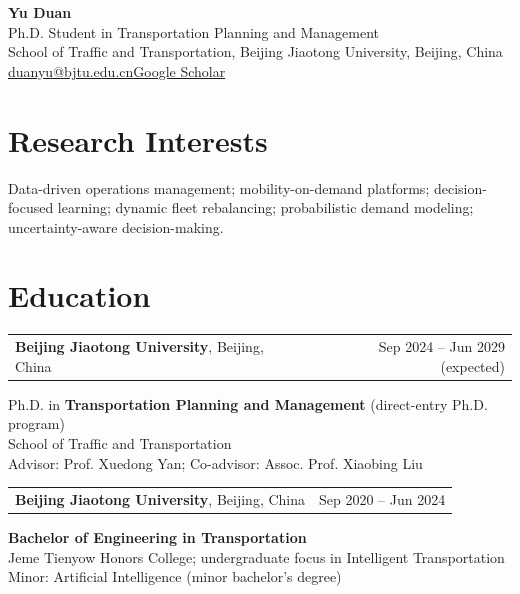 \documentclass[10.6pt,letterpaper]{article}
\newcommand{\rtime}[1]{{\small\color{muted}#1}}
\begin{document}
\begin{center}
{\fontsize{22}{25}\selectfont\bfseries Yu Duan}\\[4pt]
{\small Ph.D. Student in Transportation Planning and Management}\\[3pt]
{\small School of Traffic and Transportation, Beijing Jiaotong University, Beijing, China}\\[3pt]
{\small\href{mailto:duanyu@bjtu.edu.cn}{duanyu@bjtu.edu.cn}\quad \textbar\quad \href{https://scholar.google.com/citations?user=pLcJk40AAAAJ}{Google Scholar}}
\end{center}
\vspace{-3pt}

\section*{Research Interests}
Data-driven operations management; mobility-on-demand platforms; decision-focused learning; dynamic fleet rebalancing; probabilistic demand modeling; uncertainty-aware decision-making.

\section*{Education}
\begin{tabularx}{\linewidth}{@{}Xr@{}}
\textbf{Beijing Jiaotong University}, Beijing, China & \rtime{Sep 2024 -- Jun 2029 (expected)}\\
\end{tabularx}
Ph.D. in \textbf{Transportation Planning and Management} (direct-entry Ph.D. program)\\
School of Traffic and Transportation\\
Advisor: Prof. Xuedong Yan; Co-advisor: Assoc. Prof. Xiaobing Liu
\vspace{7pt}

\begin{tabularx}{\linewidth}{@{}Xr@{}}
\textbf{Beijing Jiaotong University}, Beijing, China & \rtime{Sep 2020 -- Jun 2024}\\
\end{tabularx}
\textbf{Bachelor of Engineering in Transportation}\\
Jeme Tienyow Honors College; undergraduate focus in Intelligent Transportation\\
Minor: Artificial Intelligence (minor bachelor's degree)
\end{document}
